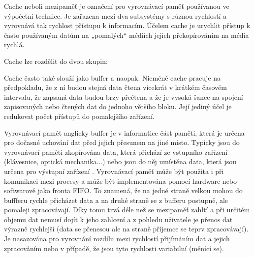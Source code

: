 \vskip 4mm
\vskip 4mm


Cache neboli mezipaměť je označení pro vyrovnávací paměť používanou ve výpočetní technice. Je zařazena mezi dva subsystémy s různou rychlostí a vyrovnává tak rychlost přístupu k informacím. Účelem cache je urychlit přístup k často používaným datům na „pomalých“ médiích jejich překopírováním na média rychlá. 

Cache lze rozdělit do dvou skupin:

\vskip 4mm
\vskip 4mm

Cache často také slouží jako buffer a naopak. Nicméně cache pracuje na předpokladu, že z ní budou stejná data čtena vícekrát v krátkém časovém intervalu, že zapsaná data budou brzy přečtena a že je vysoká šance na spojení zapisovaných nebo čtených dat do jednoho většího bloku. Její jediný účel je redukovat počet přístupů do pomalejšího zařízení.


Vyrovnávací paměť anglicky buffer je v informatice část paměti, která je určena pro dočasné uchování dat před jejich přesunem na jiné místo. Typicky jsou do vyrovnávací paměti zkopírována data, která přichází ze vstupního zařízení (klávesnice, optická mechanika...) nebo jsou do něj umístěna data, která jsou určena pro výstupní zařízení . Vyrovnávací paměť může být použita i při komunikaci mezi procesy a může být implementována pomocí hardware nebo softwarově jako fronta FIFO. To znamená, že na jedné straně velkou mohou do buffferu rychle přicházet data a na druhé straně se z bufferu postupně, ale pomaleji zpracovávají. Díky tomu trvá déle než se mezipaměť zahltí a při určitém objemu dat nemusí dojít k jeho zahlcení a z pohledu uživatele je přenos dat výrazně rychlejší (data se přenesou ale na straně příjemce se teprv zpracovávají). Je nasazována pro vyrovnání rozdílu mezi rychlostí přijímáním dat a jejich zpracováním nebo v případě, že jsou tyto rychlosti variabilní (měnící se).



